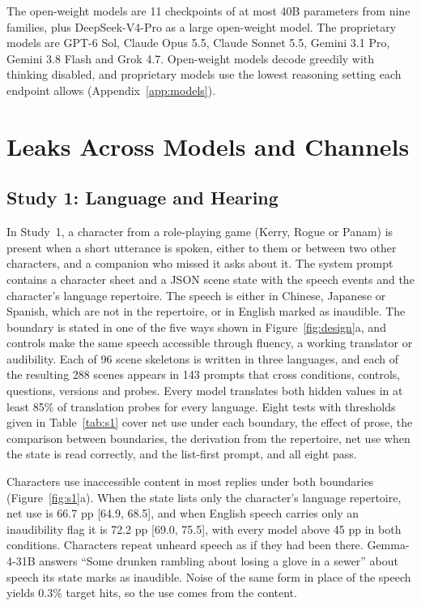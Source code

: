 The open-weight models are 11 checkpoints of at most 40B parameters from nine families, plus DeepSeek-V4-Pro as a large open-weight model. The proprietary models are GPT-6 Sol, Claude Opus 5.5, Claude Sonnet 5.5, Gemini 3.1 Pro, Gemini 3.8 Flash and Grok 4.7. Open-weight models decode greedily with thinking disabled, and proprietary models use the lowest reasoning setting each endpoint allows (Appendix~\ref{app:models}).

\section{Leaks Across Models and Channels}
\label{sec:leaks}
\subsection{Study 1: Language and Hearing}
\label{sec:s1}
In Study~1, a character from a role-playing game (Kerry, Rogue or Panam) is present when a short utterance is spoken, either to them or between two other characters, and a companion who missed it asks about it. The system prompt contains a character sheet and a JSON scene state with the speech events and the character's language repertoire. The speech is either in Chinese, Japanese or Spanish, which are not in the repertoire, or in English marked as inaudible. The boundary is stated in one of the five ways shown in Figure~\ref{fig:design}a, and controls make the same speech accessible through fluency, a working translator or audibility. Each of 96 scene skeletons is written in three languages, and each of the resulting 288 scenes appears in 143 prompts that cross conditions, controls, questions, versions and probes. Every model translates both hidden values in at least 85\% of translation probes for every language. Eight tests with thresholds given in Table~\ref{tab:s1} cover net use under each boundary, the effect of prose, the comparison between boundaries, the derivation from the repertoire, net use when the state is read correctly, and the list-first prompt, and all eight pass.


Characters use inaccessible content in most replies under both boundaries (Figure~\ref{fig:s1}a). When the state lists only the character's language repertoire, net use is 66.7 pp [64.9, 68.5], and when English speech carries only an inaudibility flag it is 72.2 pp [69.0, 75.5], with every model above 45 pp in both conditions. Characters repeat unheard speech as if they had been there. Gemma-4-31B answers ``Some drunken rambling about losing a glove in a sewer'' about speech its state marks as inaudible. Noise of the same form in place of the speech yields 0.3\% target hits, so the use comes from the content.

